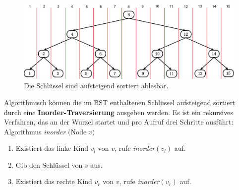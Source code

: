 \documentclass[a4paper,12pt]{article}
\begin{document}
\begin{figure}[H]
	\centering
	\includegraphics[width= 1\textwidth]{Medien/Einleitung/linksRechts}
	\caption{Die Schlüssel sind aufsteigend sortiert ablesbar. }
	\label{fig:linksRechts}
\end{figure}
\noindent Algorithmisch können die im BST enthaltenen Schlüssel aufsteigend sortiert durch eine \textbf{Inorder-Traversierung} ausgeben werden. Es ist ein rekursives Verfahren, das an der Wurzel startet und pro Aufruf drei Schritte ausführt:\\

Algorithmus \textit{inorder} $($Node $v)$
\begin{enumerate}
	\item Existiert das linke Kind $v_l$ von $v$, rufe \textit{inorder}$\left(v_l\right)$ auf. 
	\item Gib den Schlüssel von $v$ aus. 
	\item Existiert das rechte Kind $v_r$ von $v$, rufe  \textit{inorder}$\left(v_r\right)$  auf. 
\end{enumerate}
\end{document}
